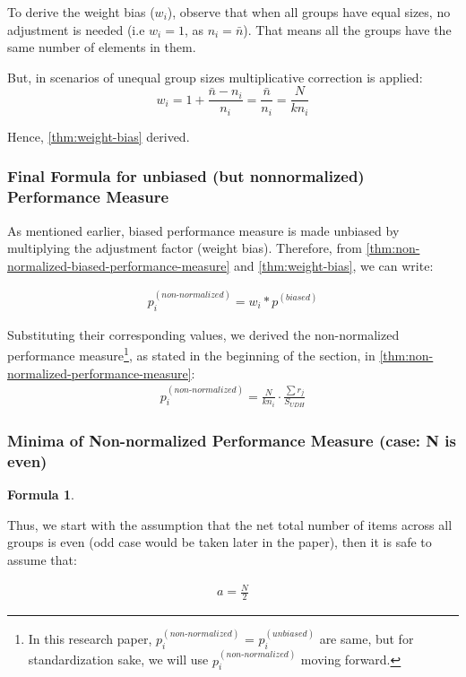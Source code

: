 \documentclass[a4paper,fleqn,review]{cas-sc}
\newtheorem{theorem}{Formula}
\begin{document}
To derive the weight bias ($w_i$), observe that when all groups have equal sizes, no adjustment is needed (i.e $w_i = 1$, as $n_i = \bar{n}$). That means all the groups have the same number of elements in them. 

But, in scenarios of unequal group sizes multiplicative correction is applied:
\[
w_i = 1 + \frac{\bar{n} - n_i}{n_i} = \frac{\bar{n}}{n_i} = \frac{N}{k n_i}
\]

Hence, \autoref{thm:weight-bias} derived.

\subsubsection{Final Formula for unbiased (but non\text{-}normalized) Performance Measure}

As mentioned earlier, biased performance measure is made unbiased by multiplying the adjustment factor (weight bias). Therefore, from \autoref{thm:non-normalized-biased-performance-measure} and \autoref{thm:weight-bias}, we can write:

\begin{align*}
	p_i^{(non\text{-}normalized)} = w_i * p^{(biased)}
\end{align*}


Substituting their corresponding values, we derived the non-normalized performance measure\footnote{In this research paper, $p_i^{(non\text{-}normalized)}$ = $p_i^{(unbiased)}$ are same, but for standardization sake, we will use $p_i^{(non\text{-}normalized)}$ moving forward.}, as stated in the beginning of the section, in \autoref{thm:non-normalized-performance-measure}:
\begin{align*}
    p_i^{(non\text{-}normalized)} = \frac{N}{k n_i} \cdot \frac{\sum r_j}{ S_{UDH} }
\label{p-non-normalized}
\end{align*}

\subsubsection{Minima of Non-normalized Performance Measure (case: N is even)}
\begin{theorem}
	
\end{theorem}
Thus, we start with the assumption that the net total number of items across all groups is even (odd case would be taken later in the paper), then it is safe to assume that:

\begin{align*}
	a = \frac{N}{2}
\end{align*}
\end{document}
